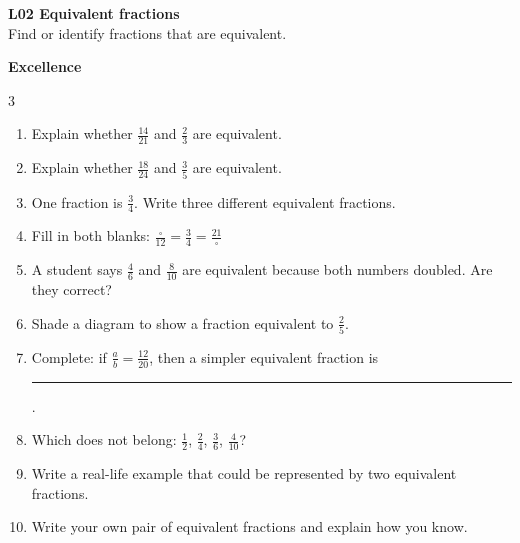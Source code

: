\documentclass[17pt,a4paper,landscape]{extarticle}
\begin{document}
\sffamily
\boldmath

\boldmath

\boldmath

\boldmath

\boldmath

\boldmath





{\LARGE \textbf{L02 Equivalent fractions}}\\[0.35em]
Find or identify fractions that are equivalent.

\vspace{2.6em}
{\LARGE \textbf{Excellence}}
\begin{multicols}{3}
\begin{enumerate}[
  itemsep=8.8em,
  label=\textbf{\arabic*.}, 
  labelwidth=2.2em,
  labelsep=0.75em,
  leftmargin=!,
  align=left
]
\item Explain whether $\frac{14}{21}$ and $\frac{2}{3}$ are equivalent.
\item Explain whether $\frac{18}{24}$ and $\frac{3}{5}$ are equivalent.
\item One fraction is $\frac{3}{4}$. Write three different equivalent fractions.
\item Fill in both blanks: $\frac{\square}{12} = \frac{3}{4} = \frac{21}{\square}$
\item A student says $\frac{4}{6}$ and $\frac{8}{10}$ are equivalent because both numbers doubled. Are they correct?
\item Shade a diagram to show a fraction equivalent to $\frac{2}{5}$.
\item Complete: if $\frac{a}{b} = \frac{12}{20}$, then a simpler equivalent fraction is \rule{2cm}{0.15mm}.
\item Which does not belong: $\frac{1}{2}$, $\frac{2}{4}$, $\frac{3}{6}$, $\frac{4}{10}$?
\item Write a real-life example that could be represented by two equivalent fractions.
\item Write your own pair of equivalent fractions and explain how you know.
\end{enumerate}
\end{multicols}
\end{document}
